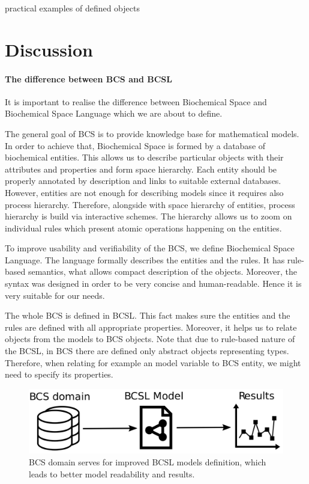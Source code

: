 \documentclass[12pt]{fithesis2}
\begin{document}
practical examples of defined objects

\chapter{Discussion}

\subsubsection{The difference between BCS and BCSL}

It is important to realise the difference between Biochemical Space and Biochemical Space Language which we are about to define.

The general goal of BCS is to provide knowledge base for mathematical models. In order to achieve that, Biochemical Space is formed by a database of biochemical entities. This allows us to describe particular objects with their attributes and properties and form space hierarchy. Each entity should be properly annotated by description and links to suitable external databases. However, entities are not enough for describing models since it requires also process hierarchy. Therefore, alongside with space hierarchy of entities, process hierarchy is build via interactive schemes. The hierarchy allows us to zoom on individual rules which present atomic operations happening on the entities.

To improve usability and verifiability of the BCS, we define Biochemical Space Language. The language formally describes the entities and the rules. It has rule-based semantics, what allows compact description of the objects. Moreover, the syntax was designed in order to be very concise and human-readable. Hence it is very suitable for our needs.

The whole BCS is defined in BCSL. This fact makes sure the entities and the rules are defined with all appropriate properties. Moreover, it helps us to relate objects from the models to BCS objects. Note that due to rule-based nature of the BCSL, in BCS there are defined only abstract objects representing types. Therefore, when relating for example an model variable to BCS entity, we might need to specify its properties. 

\begin{figure}[!h]
\begin{center}
  \includegraphics[scale=0.13]{pics/bcsl_vs_bcs.pdf}
\end{center}
\caption{BCS domain serves for improved BCSL models definition, which leads to better model readability and results.}
\end{figure}
\end{document}
